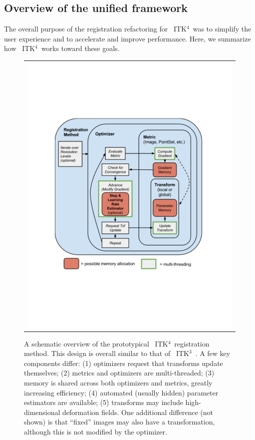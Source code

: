 \documentclass{frontiersSCNS}
\newcommand{\tk}{~ITK$^{\text{4}}$~}
\newcommand{\tkt}{~ITK$^{\text{3}}$~}
\begin{document}
\subsection{Overview of the unified framework}
The overall purpose of the registration refactoring for \tk was to
simplify the user experience and to accelerate and improve
performance. Here, we summarize how \tk works toward these goals.
\begin{figure}[t]
\begin{center}
\begin{tabular}{c}
\includegraphics[width=5in]{figs/software_design.pdf}
\end{tabular}
\caption{A schematic overview of the
  prototypical \tk registration method.  This design is overall similar to
  that of \tkt.  A few key components differ:  (1) optimizers request that
  transforms update themselves; (2) metrics and optimizers are
  multi-threaded; (3) memory is shared across both optimizers and metrics,
greatly increasing efficiency; (4) automated (usually hidden) parameter
estimators are available; (5) transforms may include high-dimensional
deformation fields.  One additional difference (not shown) is that ``fixed''
images may also have a transformation, although this is not modified
by the optimizer.}
\label{fig:softw}
\end{center}
\end{figure}
\end{document}
